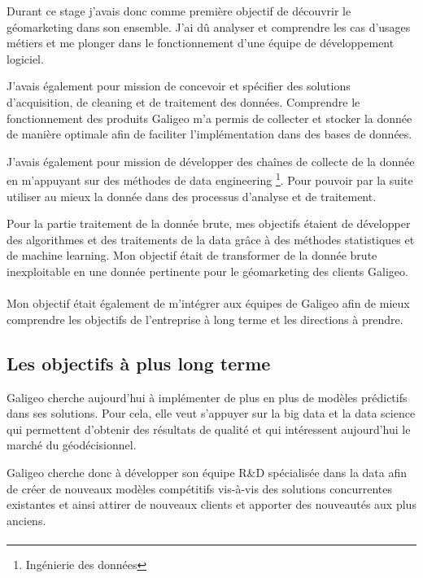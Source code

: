 Durant ce stage j’avais donc comme première objectif de découvrir le géomarketing dans son ensemble. J’ai dû analyser et comprendre les cas d’usages métiers et me plonger dans le fonctionnement d’une équipe de développement logiciel.

J’avais également pour mission de concevoir et spécifier des solutions d’acquisition, de cleaning et de traitement des données. Comprendre le fonctionnement des produits Galigeo m’a permis de collecter et stocker la donnée de manière optimale afin de faciliter l’implémentation dans des bases de données.

J’avais également pour mission de développer des chaînes de collecte de la donnée en m’appuyant sur des méthodes de data engineering \footnote{Ingénierie des données}. Pour pouvoir par la suite utiliser au mieux la donnée dans des processus d’analyse et de traitement.

Pour la partie traitement de la donnée brute, mes objectifs étaient de développer des algorithmes et des traitements de la data grâce à des méthodes statistiques et de machine learning. Mon objectif était de transformer de la donnée brute inexploitable en une donnée pertinente pour le géomarketing des clients Galigeo.

\paragraph*{}

Mon objectif était également de m’intégrer aux équipes de Galigeo afin de mieux comprendre les objectifs de l’entreprise à long terme et les directions à prendre.


\subsection{Les objectifs à plus long terme}

Galigeo cherche aujourd’hui à implémenter de plus en plus de modèles prédictifs dans ses solutions. Pour cela, elle veut s’appuyer sur la big data et la data science qui permettent d’obtenir des résultats de qualité et qui intéressent aujourd’hui le marché du géodécisionnel.

Galigeo cherche donc à développer son équipe R\&D spécialisée dans la data afin de créer de nouveaux modèles compétitifs vis-à-vis des solutions concurrentes existantes et ainsi attirer de nouveaux clients et apporter des nouveautés aux plus anciens.

\paragraph*{}

